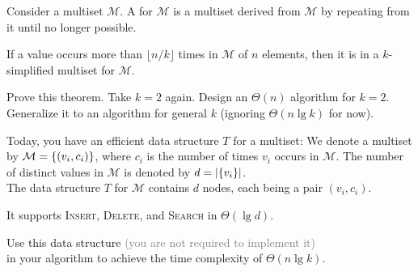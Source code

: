 \begin{frame}{}
  
  \begin{definition}
    Consider a multiset $\mathcal{M}$.
    A  for $\mathcal{M}$ is a multiset derived from $\mathcal{M}$
    by repeating  from it until no longer possible.

  \end{definition}


  \begin{theorem}
    If a value occurs more than $\lfloor n / k \rfloor$ times in $\mathcal{M}$ of $n$ elements,
    then it is in a $k$-simplified multiset for $\mathcal{M}$.
  \end{theorem}

  Prove this theorem. Take $k = 2$ again. Design an $\Theta(n)$ algorithm for $k = 2$. 
  Generalize it to an algorithm for general $k$ (ignoring $\Theta(n \lg k)$ for now).
\end{frame}

\begin{frame}{}

  \vspace{0.30cm}
  \begin{exampleblock}{Today, you have an efficient data structure $T$ for a multiset:}
    We denote a multiset by $\mathcal{M} = \{(v_i, c_i)\}$,
    where $c_i$ is the number of times $v_i$ occurs in $\mathcal{M}$.
    The number of distinct values in $\mathcal{M}$ is denoted by $d = |\{v_i\}|$.\\[6pt]

    The data structure $T$ for $\mathcal{M}$ contains $d$ nodes, each being a pair $(v_i, c_i)$.

    It supports \textsc{Insert}, \textsc{Delete}, and \textsc{Search} in $\Theta(\lg d)$.
  \end{exampleblock}

  \begin{center}
    Use this data structure \textcolor{gray}{\small (you are not required to implement it)} \\
    in your algorithm to achieve the time complexity of $\Theta(n \lg k)$.
  \end{center}
\end{frame}

